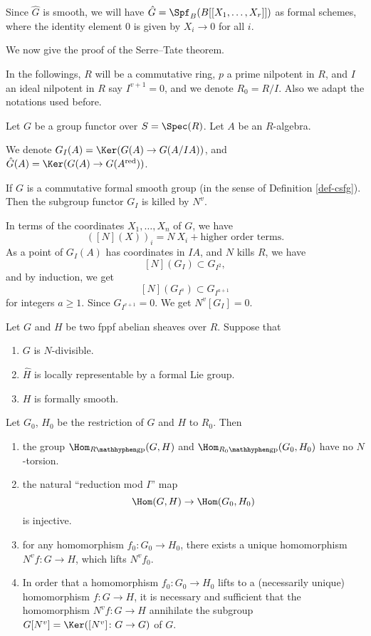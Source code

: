 \documentclass[twoside]{article}
\begin{document}
Since $\hat{G}$ is smooth, we will have $\hat{G}=\Spf_{B}(B[[X_{1},\dotsc,X_{r}]])$ 
as formal schemes, where the identity element $0$ is given by $X_{i}\to 0$ for all $i$.

We now give the proof of the Serre--Tate theorem.

In the followings, $R$ will be a commutative ring, $p$ a prime nilpotent in $R$,
and $I$ an ideal nilpotent in $R$ say $I^{v+1}=0$, and we denote $R_{0}=R/I$.
Also we adapt the notations used before.

Let $G$ be a group functor over $S=\Spec(R)$. Let $A$ be an $R$-algebra.

We denote $G_{I}(A)=\Ker(G(A)\to G(A/IA))$, and $\hat{G}(A)=\Ker(G(A)\to G(A^{\mathrm{red}}))$.

\begin{lemma} \label{lem-a}
    If $G$ is a commutative formal smooth group
    (in the sense of Definition \ref{def-csfg}).
    Then the subgroup functor $G_{I}$ is killed by $N^{v}$.
\end{lemma}

\pf
    In terms of the coordinates $X_{1},\dotsc,X_{n}$ of $G$, we have 
    \[    ([N](X))_{i}=N\ X_{i} + \text{higher order terms} .  \]
    As a point of $G_{I}(A)$ has coordinates in $IA$, and $N$ kills $R$, we have 
    \[    [N](G_{I}) \subset G_{I^{2}},   \]
    and by induction, we get 
    \[    [N](G_{I^{a}}) \subset G_{I^{a+1}}  \]
    for integers $a\ge 1$. Since $G_{I^{v+1}}=0 $. We get $N^{v}[G_{I}]=0$.
\epf

\begin{lemma}[Drinfeld]
    Let $G$ and $H$ be two fppf abelian sheaves over $R$. Suppose that 
    \begin{enumerate}
        \item $G$ is $N$-divisible.
        \item $\hat{H}$ is locally representable by a formal Lie group.
        \item $H$ is formally smooth.
    \end{enumerate}
    Let $G_{0}$, $H_{0}$ be the restriction of $G$ and $H$ to $R_{0}$. Then
    \begin{enumerate}
        \item the group $\Hom_{R\mathhyphen\mathrm{gp}}(G,H)$ and
        $\Hom_{R_{0}\mathhyphen\mathrm{gp}}(G_{0},H_{0})$ have no $N$-torsion.
        \item the natural ``reduction mod $I$'' map 
        \[ \Hom(G,H)\to\Hom(G_{0},H_{0})\]
        is injective.
        \item for any homomorphism $f_{0}\colon G_{0} \to H_{0} $,
        there exists a unique homomorphism $N^{v}f \colon   G\to H$,
        which lifts $N^{v}f_{0}$.
        \item In order that a homomorphism $f_{0} \colon  G_{0} \to H_{0}$ 
        lifts to a (necessarily unique) homomorphism $f\colon G\to H$,
        it is necessary and sufficient that the homomorphism 
        $N^{v}f\colon  G\to H$ annihilate the subgroup $G[N^{v}]=\Ker([N^{v}] \colon G\to G )$ of $G$.
    \end{enumerate}
\end{lemma}
\end{document}
